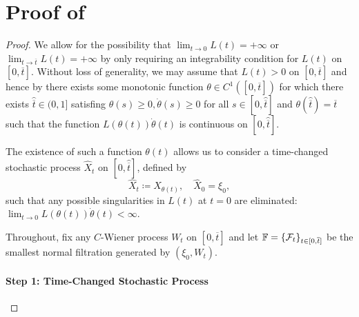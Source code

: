 \section{Proof of } \label{prf:thm:exist}
\restatethmexist*
\begin{proof}
  We allow for the possibility that \(\lim_{t \to 0} L(t) = +\infty\) or \(\lim_{t \to \overline{t}} L(t) = +\infty \) by only requiring an integrability condition for \(L(t)\) on \([0, \overline{t}]\). Without loss of generality, we may assume that \(L(t) > 0\) on \([0, \overline{t}]\) and hence by  there exists some monotonic function \(\theta \in C^{1}([0, \overline{t}])\) for which there exists \(\hat{\overline{t}} \in (0, 1]\) satisfing \(\theta(s) \geq 0, \dot{\theta}(s) \geq 0\) for all \(s \in [0, \hat{\overline{t}}]\) and \(\theta(\hat{\overline{t}}) = \overline{t}\) such that the function \(L(\theta(t))\dot{\theta}(t)\) is continuous on \([0, \hat{\overline{t}}]\).

  The existence of such a function \(\theta(t)\) allows us to consider a time-changed stochastic process \(\hat{X}_{t}\) on \([0, \hat{\overline{t}}]\), defined by
  \[\hat{X}_{t} \coloneqq X_{\theta(t)}, \quad \hat{X}_{0} = \xi_{0},\] such that any possible singularities in \(L(t)\) at \(t = 0\) are eliminated: \(\lim_{t \to 0} L(\theta(t)) \dot{\theta}(t) < \infty\).

  Throughout, fix any \(C\)-Wiener process \(W_{t}\) on \([0, \overline{t}]\) and let \(\mathbb{F} = \qty{\mathcal{F}_{t}}_{t \in [0, \overline{t}]}\) be the smallest normal filtration generated by \((\xi_{0}, W_{t})\).

  \paragraph{Step 1: Time-Changed Stochastic Process}


\end{proof}
